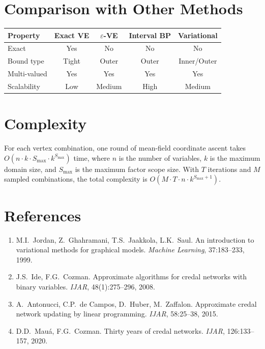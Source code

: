 \documentclass[11pt]{article}
\begin{document}
\section{Comparison with Other Methods}

\begin{center}
\begin{tabular}{lcccc}
\toprule
\textbf{Property} & \textbf{Exact VE} & \textbf{$\varepsilon$-VE} & \textbf{Interval BP} & \textbf{Variational} \\
\midrule
Exact & Yes & No & No & No \\
Bound type & Tight & Outer & Outer & Inner/Outer \\
Multi-valued & Yes & Yes & Yes & Yes \\
Scalability & Low & Medium & High & Medium \\
\bottomrule
\end{tabular}
\end{center}

\section{Complexity}

For each vertex combination, one round of mean-field coordinate ascent takes
$O(n \cdot k \cdot S_{\max} \cdot k^{S_{\max}})$ time, where $n$ is the number of
variables, $k$ is the maximum domain size, and $S_{\max}$ is the maximum factor
scope size. With $T$ iterations and $M$ sampled combinations, the total complexity
is $O(M \cdot T \cdot n \cdot k^{S_{\max}+1})$.

\section{References}

\begin{enumerate}
\item M.I.\ Jordan, Z.\ Ghahramani, T.S.\ Jaakkola, L.K.\ Saul. An introduction to
      variational methods for graphical models. \emph{Machine Learning}, 37:183--233, 1999.
\item J.S.\ Ide, F.G.\ Cozman. Approximate algorithms for credal networks with binary
      variables. \emph{IJAR}, 48(1):275--296, 2008.
\item A.\ Antonucci, C.P.\ de Campos, D.\ Huber, M.\ Zaffalon. Approximate credal
      network updating by linear programming. \emph{IJAR}, 58:25--38, 2015.
\item D.D.\ Mau\'a, F.G.\ Cozman. Thirty years of credal networks. \emph{IJAR},
      126:133--157, 2020.
\end{enumerate}
\end{document}

